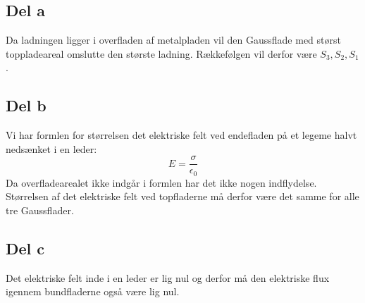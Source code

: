 \subsection{Del a} %
\label{sub:del_a}
Da ladningen ligger i overfladen af metalpladen vil den Gaussflade med størst toppladeareal omslutte den største ladning. Rækkefølgen vil derfor være $S_3, S_2, S_1$.

\subsection{Del b} %
\label{sub:del_b}
Vi har formlen for størrelsen det elektriske felt ved endefladen på et legeme halvt nedsænket i en leder:
\begin{equation}
	E = \frac{\sigma}{\epsilon _0}
\end{equation}
Da overfladearealet ikke indgår i formlen har det ikke nogen indflydelse. Størrelsen af det elektriske felt ved topfladerne må derfor være det samme for alle tre Gaussflader.

\subsection{Del c} %
\label{sub:del_c}
Det elektriske felt inde i en leder er lig nul og derfor må den elektriske flux igennem bundfladerne også være lig nul.
